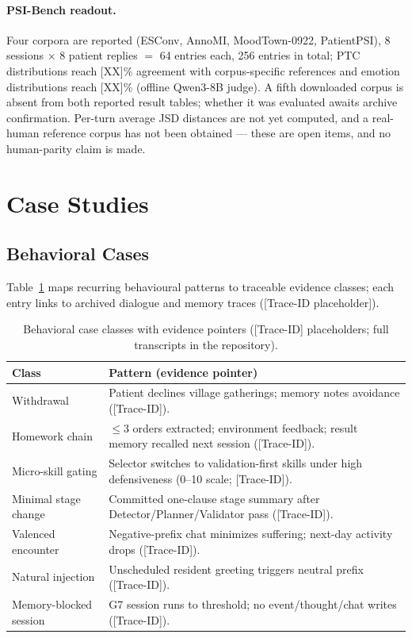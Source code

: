 \documentclass[10pt]{article}
\newcommand{\sys}{MoodTown}
\begin{document}
\paragraph{PSI-Bench readout.}
Four corpora are reported (ESConv, AnnoMI, \sys-0922, PatientPSI), 8 sessions $\times$ 8 patient replies $=$ 64 entries each, 256 entries in total; PTC distributions reach [XX]\% agreement with corpus-specific references and emotion distributions reach [XX]\% (offline Qwen3-8B judge).
A fifth downloaded corpus is absent from both reported result tables; whether it was evaluated awaits archive confirmation.
Per-turn average JSD distances are not yet computed, and a real-human reference corpus has not been obtained --- these are open items, and no human-parity claim is made.

\section{Case Studies}\label{app:cases}

\subsection{Behavioral Cases}

Table~\ref{tab:cases} maps recurring behavioural patterns to traceable evidence classes; each entry links to archived dialogue and memory traces ([Trace-ID placeholder]).

\begin{table}[h]
\centering
\caption{Behavioral case classes with evidence pointers ([Trace-ID] placeholders; full transcripts in the repository).}
\label{tab:cases}
\small
\begin{tabular}{@{}lp{10.2cm}@{}}
\toprule
Class & Pattern (evidence pointer) \\
\midrule
Withdrawal & Patient declines village gatherings; memory notes avoidance ([Trace-ID]). \\
Homework chain & $\le$3 orders extracted; environment feedback; result memory recalled next session ([Trace-ID]). \\
Micro-skill gating & Selector switches to validation-first skills under high defensiveness (0--10 scale; [Trace-ID]). \\
Minimal stage change & Committed one-clause stage summary after Detector/Planner/Validator pass ([Trace-ID]). \\
Valenced encounter & Negative-prefix chat minimizes suffering; next-day activity drops ([Trace-ID]). \\
Natural injection & Unscheduled resident greeting triggers neutral prefix ([Trace-ID]). \\
Memory-blocked session & G7 session runs to threshold; no event/thought/chat writes ([Trace-ID]). \\
\bottomrule
\end{tabular}
\end{table}
\end{document}
